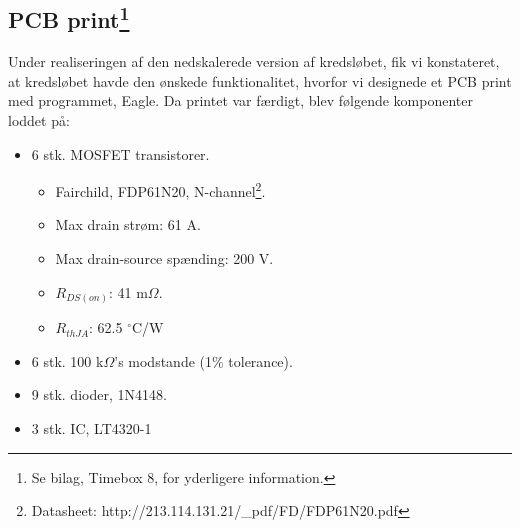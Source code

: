 




\subsection[PDB print]{PCB print\protect\footnote{Se bilag, Timebox 8, for yderligere information.}}
\label{sec:pcb-printf-bilag}

Under realiseringen af den nedskalerede version af kredsløbet, fik vi konstateret, at kredsløbet havde den ønskede funktionalitet, hvorfor vi designede et PCB print med programmet, Eagle. Da printet var færdigt, blev følgende komponenter loddet på:

\begin{itemize}
\item 6 stk. MOSFET transistorer.
  \begin{itemize}
  \item Fairchild, FDP61N20, N-channel\footnote{Datasheet: http://213.114.131.21/_pdf/FD/FDP61N20.pdf}.
  \item Max drain strøm: 61 A.
  \item Max drain-source spænding: 200 V.
  \item $R_{DS(on)}$: 41 m$\Omega$.
  \item $R_{thJA}$: 62.5 $^\circ$C/W
\end{itemize}
\item 6 stk. 100 k$\Omega$’s modstande (1\% tolerance).
\item 9 stk. dioder, 1N4148.
\item 3 stk. IC, LT4320-1 
\end{itemize}

